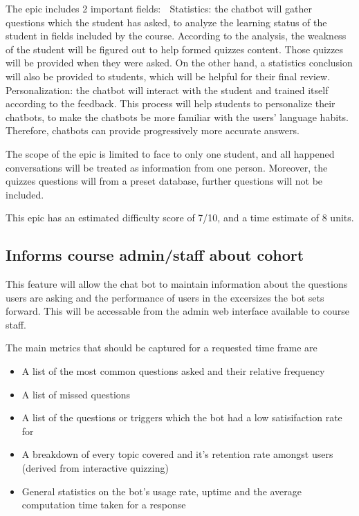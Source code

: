 \documentclass{article}
\begin{document}
The epic includes 2 important fields:
	Statistics: the chatbot will gather questions which the student has asked, to analyze the learning status of the student in fields included by the course. According to the analysis, the weakness of the student will be figured out to help formed quizzes content. Those quizzes will be provided when they were asked. On the other hand, a statistics conclusion will also be provided to students, which will be helpful for their final review.
	Personalization: the chatbot will interact with the student and trained itself according to the feedback. This process will help students to personalize their chatbots, to make the chatbots be more familiar with the users’ language habits. Therefore, chatbots can provide progressively more accurate answers. 

The scope of the epic is limited to face to only one student, and all happened conversations will be treated as information from one person. Moreover, the quizzes questions will from a preset database, further questions will not be included.

This epic has an estimated difficulty score of 7/10, and a time estimate of 8 units.


\subsection{Informs course admin/staff about cohort}

This feature will allow the chat bot to maintain information about the questions users are asking and the performance of users in the excersizes the bot sets forward. This will be accessable from the admin web interface available to course staff.

The main metrics that should be captured for a requested time frame are
\begin{itemize}
  \item A list of the most common questions asked and their relative frequency
  \item A list of missed questions
  \item A list of the questions or triggers which the bot had a low satisifaction rate for
  \item A breakdown of every topic covered and it's retention rate amongst users (derived from interactive quizzing)
  \item General statistics on the bot's usage rate, uptime and the average computation time taken for a response
\end{itemize}
\end{document}
